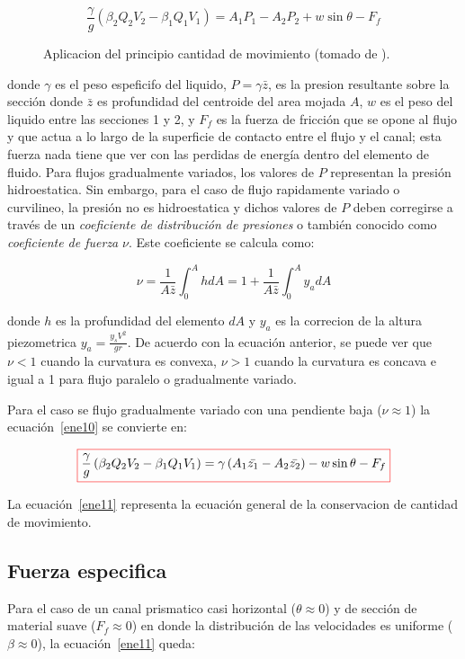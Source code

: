 \documentclass[11pt, oneside]{article}
\begin{document}
\begin{equation}
\frac{\gamma}{g}\left(\beta_2 Q_2 V_2 - \beta_1 Q_1 V_1 \right) = A_1 P_1 - A_2 P_2 + w \sin \theta - F_f
\label{ene10}
\end{equation}

\begin{figure}[h]
\centering
\caption{Aplicacion del principio  cantidad de movimiento (tomado de \cite{VChow}).}
\label{fig11}
\end{figure}


donde $\gamma$ es el peso espeficifo del liquido, $P=\gamma \bar{z}$, es la presion resultante sobre la secci\'on donde $\bar{z}$ es profundidad del centroide del area mojada $A$, $w$ es el peso del liquido entre las secciones 1 y 2, y $F_f$ es la fuerza de fricci\'on que se opone al flujo y que actua a lo largo de la superficie de contacto entre el flujo y el canal; esta fuerza nada tiene que ver con las perdidas de energ\'ia dentro del elemento de fluido. Para flujos gradualmente variados, los valores de $P$ representan la presi\'on hidroestatica. Sin embargo, para el caso de flujo rapidamente variado o curvilineo, la presi\'on no es hidroestatica y dichos valores de $P$ deben corregirse a trav\'es de un \emph{coeficiente de distribuci\'on de presiones} o tambi\'en conocido como \emph{coeficiente de fuerza} $\nu$. Este coeficiente se calcula como: 

$$
\nu = \frac{1}{A\bar{z}} \int_0^A h dA = 1 + \frac{1}{A\bar{z}} \int_0^A y_a dA
$$

donde $h$ es la profundidad del elemento $dA$ y $y_a$ es la correcion de la altura piezometrica $y_a=\frac{y_s V^2}{gr}$. De acuerdo con la ecuaci\'on anterior, se puede ver que $\nu < 1$ cuando la curvatura es convexa, $\nu > 1$ cuando la curvatura es concava e igual a 1 para flujo paralelo o gradualmente variado. 

Para el caso se flujo gradualmente variado con una pendiente baja ($\nu \approx 1$) la ecuaci\'on~\ref{ene10} se convierte en:

\begin{equation}
\color{red}\boxed{\color{black} \frac{\gamma}{g}\left(\beta_2 Q_2 V_2 - \beta_1 Q_1 V_1 \right) = \gamma \left( A_1 \bar{z_1} - A_2 \bar{z_2} \right) - w \sin \theta - F_f}
\label{ene11}
\end{equation}

La ecuaci\'on~\ref{ene11} representa la ecuaci\'on general de la conservacion de cantidad de movimiento. 
\subsection{Fuerza especifica}
Para el caso de un canal prismatico casi horizontal ($\theta \approx 0$) y de secci\'on de material suave ($F_f \approx 0$) en donde la distribuci\'on de las velocidades es uniforme ($\beta \approx 0$), la ecuaci\'on~\ref{ene11} queda:
\end{document}

